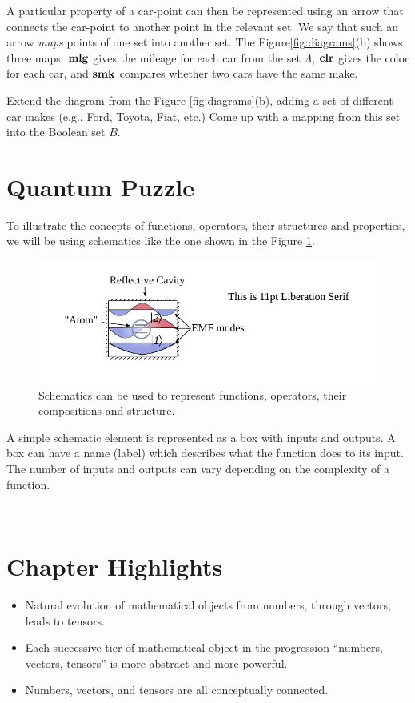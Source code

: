 A particular property of a car-point
can then be represented using an arrow that connects the car-point to
another point in the relevant set. We say that such an arrow \emph{maps}
points of one set into another set. The Figure\ref{fig:diagrams}(b)
shows three maps: $\textrm{\bf mlg}$ gives the mileage for each car from the
set $\Lambda$, $\textrm{\bf clr}$ gives the color for each car, and
$\textrm{\bf smk}$ compares whether two cars have the same make.

\begin{exercise}
Extend the diagram from the Figure \ref{fig:diagrams}(b), adding a set
of different car makes (e.g., Ford, Toyota, Fiat, etc.) Come up with a
mapping from this set into the Boolean set $B$.
\label{exe:carMakesSet}
\end{exercise}

\section{Quantum Puzzle}
To illustrate the concepts of functions, operators, their structures and
properties, we will be using schematics like the one
shown in the Figure \ref{fig:schematicExample}.
\begin{figure}[htbp]
  \centering
  \includegraphics[scale=1.0]{defaultFigureTemplate}
  \caption{Schematics can be used to represent functions, operators,
    their compositions and structure.}
  \label{fig:schematicExample}
\end{figure}

A simple schematic element is represented as a box with inputs
and outputs. A box can have a name (label) which describes what the
function does to its input.  The number of inputs and
outputs can vary depending on the complexity of a function.

\

\vspace{1cm}
\section*{Chapter Highlights}
{\chhc
  \it
\begin{itemize}
\item Natural evolution of mathematical objects from numbers, through
  vectors, leads to tensors.
\item Each successive tier of mathematical object in the progression
  ``numbers, vectors, tensors''  is more abstract and more powerful.
\item Numbers, vectors, and tensors are all conceptually connected.
\end{itemize}
}
